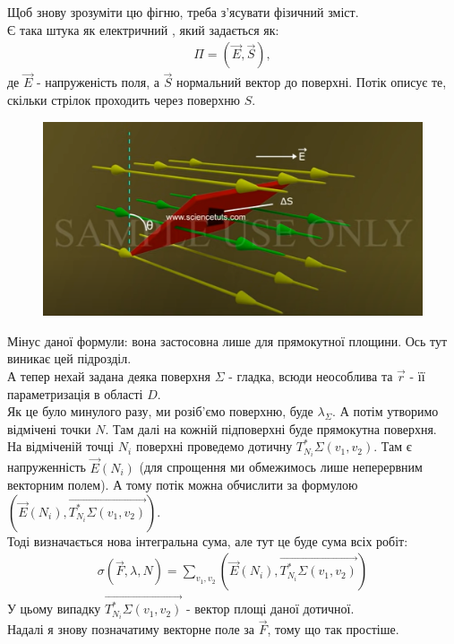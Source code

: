 \documentclass[a4paper, 10pt]{article}
\theoremstyle{theoremdd}
\theoremstyle{theoremdd}
\theoremstyle{theoremdd}
\theoremstyle{theoremdd}
\theoremstyle{theoremdd}
\theoremstyle{theoremdd}
\theoremstyle{theoremdd}
\theoremstyle{theoremdd}
\begin{document}
Щоб знову зрозуміти цю фігню, треба з'ясувати фізичний зміст.\\
Є така штука як електричний , який задається як:
\begin{align*}
\Pi = (\vec{E}, \vec{S}),
\end{align*}
де $\vec{E}$ - напруженість поля, а $\vec{S}$ нормальний вектор до поверхні. Потік описує те, скільки стрілок проходить через поверхню $S$.
\begin{figure}[H]
\centering
\includegraphics[scale=0.5]{SurfaceIntegralKind2.png}
\end{figure}
Мінус даної формули: вона застосовна лише для прямокутної площини. Ось тут виникає цей підрозділ.\\
А тепер нехай задана деяка поверхня $\Sigma$ - гладка, всюди неособлива та $\vec{r}$ - її параметризація в області $D$.\\
Як це було минулого разу, ми розіб'ємо поверхню, буде $\lambda_\Sigma$. А потім утворимо відмічені точки $N$. Там далі на кожній підповерхні буде прямокутна поверхня.\\
На відміченій точці $N_i$ поверхні проведемо дотичну $T^*_{N_i} \Sigma(v_1,v_2)$. Там є напруженність $\vec{E}(N_i)$ (для спрощення ми обмежимось лише неперервним векторним полем). А тому потік можна обчислити за формулою $( \vec{E}(N_i), \overrightarrow{T^*_{N_i} \Sigma(v_1,v_2)} )$.\\
Тоді визначається нова інтегральна сума, але тут це буде сума всіх робіт:
\begin{align*}
\sigma(\vec{F},\lambda,N) = \displaystyle\sum_{v_1,v_2} \left( \vec{E}(N_i), \overrightarrow{T^*_{N_i} \Sigma(v_1,v_2)} \right)
\end{align*}
У цьому випадку $\overrightarrow{T^*_{N_i} \Sigma(v_1,v_2)}$ - вектор площі даної дотичної.\\
Надалі я знову позначатиму векторне поле за $\vec{F}$, тому що так простіше.
\end{document}
